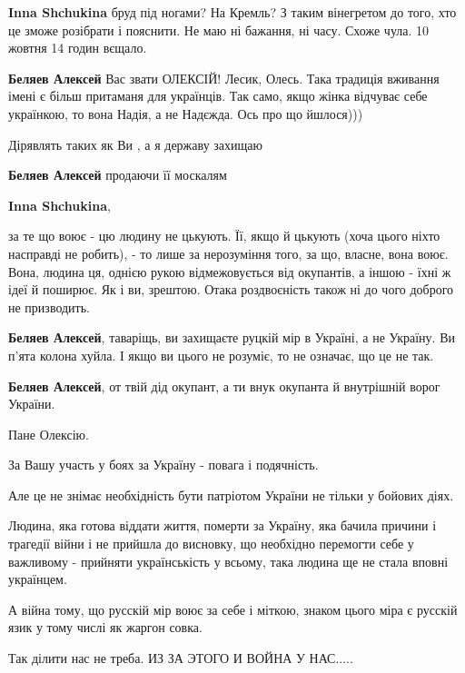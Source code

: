\begin{itemize}
\begin{itemize}
\textbf{Inna Shchukina} бруд під ногами? На Кремль? З таким вінегретом до того, хто це зможе розібрати і пояснити. Не маю ні бажання, ні часу. Схоже чула. 10 жовтня 14 годин вєщало.

\textbf{Беляев Алексей} Вас звати ОЛЕКСІЙ! Лесик, Олесь. Така традиція вживання імені є більш притаманя для українців. Так само, якщо жінка відчуває себе українкою, то вона Надія, а не Надєжда. Ось про що йшлося)))

Дірявлять таких як Ви , а я державу захищаю

\textbf{Беляев Алексей} продаючи її москалям

\textbf{Inna Shchukina}, 

за те що воює - цю людину не цькують. Її, якщо й цькують (хоча цього ніхто
насправді не робить), - то лише за нерозуміння того, за що, власне, вона воює.
Вона, людина ця, однією рукою відмежовується від окупантів, а іншою - їхні ж
ідеї й поширює. Як і ви, зрештою. Отака роздвоєність також ні до чого доброго
не призводить.

\textbf{Беляев Алексей}, таваріщь, ви захищаєте руцкій мір в Україні, а не Україну. Ви п'ята колона хуйла. І якщо ви цього не розуміє, то не означає, що це не так.

\textbf{Беляев Алексей}, от твій дід окупант, а ти внук окупанта й внутрішній ворог України.

Пане Олексію.

За Вашу участь у боях за Україну - повага і подячність.

Але це не знімає необхідність бути патріотом України не тільки у бойових діях.

Людина, яка готова віддати життя, померти за Україну, яка бачила причини і
трагедії війни і не прийшла до висновку, що необхідно перемогти себе у
важливому - прийняти українськість у всьому, така людина ще не стала вповні
українцем.

А війна тому, що русскій мір воює за себе і міткою, знаком цього міра є русскій
язик у тому числі як жаргон совка.

\end{itemize} %

Так ділити нас не треба. ИЗ ЗА ЭТОГО И ВОЙНА У НАС.....

\end{itemize} %
